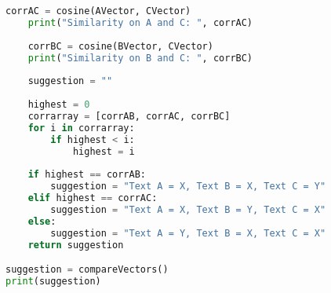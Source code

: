 \begin{lstlisting}[language=Python]
    corrAC = cosine(AVector, CVector)
    print("Similarity on A and C: ", corrAC)
    
    corrBC = cosine(BVector, CVector)
    print("Similarity on B and C: ", corrBC)
    
    suggestion = ""
    
    highest = 0
    corrarray = [corrAB, corrAC, corrBC]
    for i in corrarray:
        if highest < i:
            highest = i
            
    if highest == corrAB:
        suggestion = "Text A = X, Text B = X, Text C = Y"
    elif highest == corrAC:
        suggestion = "Text A = X, Text B = Y, Text C = X"
    else:
        suggestion = "Text A = Y, Text B = X, Text C = X"
    return suggestion

suggestion = compareVectors()
print(suggestion)
\end{lstlisting}